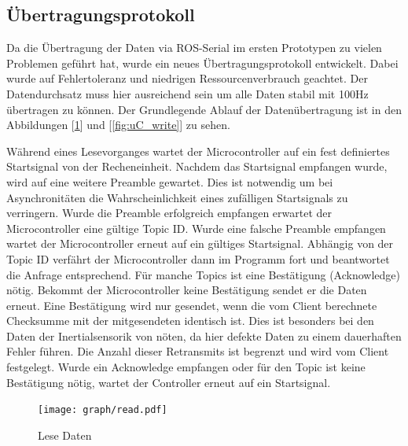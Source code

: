 \subsection{Übertragungsprotokoll}
Da die Übertragung der Daten via ROS-Serial im ersten Prototypen zu vielen Problemen geführt hat, wurde ein neues Übertragungsprotokoll entwickelt.
Dabei wurde auf Fehlertoleranz und niedrigen Ressourcenverbrauch geachtet. Der Datendurchsatz muss hier ausreichend sein um alle Daten stabil mit 100Hz
übertragen zu können.
Der Grundlegende Ablauf der Datenübertragung ist in den Abbildungen [\ref{fig:uC_read}] und [\ref{fig:uC_write}] zu sehen.


Während eines Lesevorganges wartet der Microcontroller auf ein fest definiertes Startsignal von der Recheneinheit. Nachdem das Startsignal empfangen wurde, wird auf eine weitere Preamble gewartet.
Dies ist notwendig um bei Asynchronitäten die Wahrscheinlichkeit eines zufälligen Startsignals zu verringern. Wurde die Preamble erfolgreich empfangen erwartet der Microcontroller eine gültige Topic ID.
Wurde eine falsche Preamble empfangen wartet der Microcontroller erneut auf ein gültiges Startsignal. Abhängig von der Topic ID verfährt der Microcontroller dann im Programm fort und beantwortet
die Anfrage entsprechend. Für manche Topics ist eine Bestätigung (Acknowledge) nötig. Bekommt der Microcontroller keine Bestätigung sendet er die Daten erneut. Eine Bestätigung wird nur gesendet,
wenn die vom Client berechnete Checksumme mit der mitgesendeten identisch ist. Dies ist besonders bei den Daten der Inertialsensorik von nöten, da hier defekte Daten zu einem dauerhaften Fehler führen. 
Die Anzahl dieser Retransmits ist begrenzt und wird vom Client festgelegt. Wurde ein Acknowledge empfangen oder für den Topic ist keine Bestätigung
nötig, wartet der Controller erneut auf ein Startsignal.

\begin{figure}[ht]
\centering
\texttt{[image: graph/read.pdf]} 
\caption{Lese Daten}
\label{fig:uC_read}
\end{figure}

